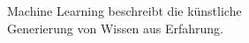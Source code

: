 \documentclass[preview]{standalone}
\begin{document}
\begin{center}
Machine Learning beschreibt die künstliche \\ Generierung von Wissen aus Erfahrung.
\end{center}
\end{document}
